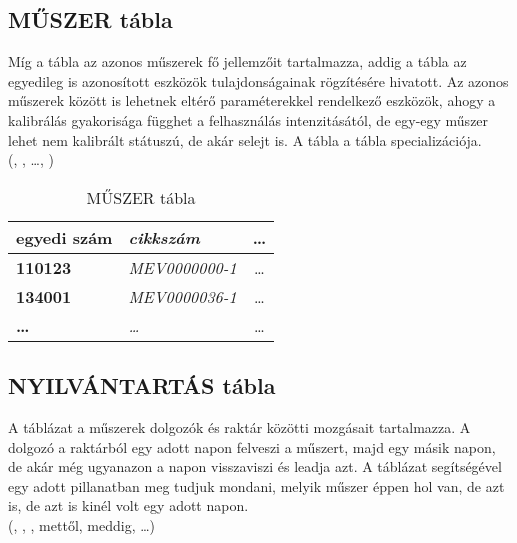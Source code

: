 \subsection{MŰSZER tábla}
Míg a  tábla az azonos műszerek fő jellemzőit tartalmazza, addig a  tábla az egyedileg is azonosított eszközök tulajdonságainak rögzítésére hivatott.
Az azonos műszerek között is lehetnek eltérő paraméterekkel rendelkező eszközök, ahogy a kalibrálás gyakorisága függhet a felhasználás intenzitásától, de egy-egy műszer lehet nem kalibrált státuszú, de akár selejt is.
A  tábla a  tábla specializációja.\\

(, , \dots, )

\begin{table}[ht!]
	\centering
	\begin{footnotesize}
	\begin{tabular}[t]{|l|l|c|}
		\hline
		\textbf{egyedi szám}&\textit{cikkszám}&\dots \\ \hline
		\textbf{110123}&\textit{MEV0000000-1}&\dots\\
		\textbf{134001}&\textit{MEV0000036-1}&\dots\\
		\textbf{\dots}&\textit{\dots}&\dots\\
	\end{tabular}
\end{footnotesize}
	\caption{MŰSZER tábla}\label{tabMUSZER}
\end{table}


\subsection{NYILVÁNTARTÁS tábla}
A táblázat a műszerek dolgozók és raktár közötti mozgásait tartalmazza. A dolgozó a raktárból egy adott napon felveszi a műszert, majd egy másik napon, de akár még ugyanazon a napon visszaviszi és leadja azt. A táblázat segítségével egy adott pillanatban meg tudjuk mondani, melyik műszer éppen hol van, de azt is, de azt is kinél volt egy adott napon. \\

(, , , mettől, meddig, \dots)\\

